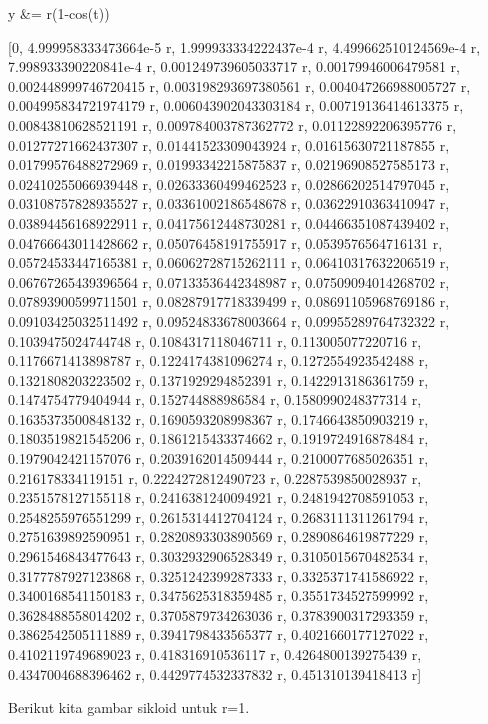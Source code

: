 \documentclass{article}
\begin{document}
\>y &= r\*(1-cos(t))


    
            [0, 4.999958333473664e-5 r, 1.999933334222437e-4 r, 
    4.499662510124569e-4 r, 7.998933390220841e-4 r, 
    0.001249739605033717 r, 0.00179946006479581 r, 
    0.002448999746720415 r, 0.003198293697380561 r, 
    0.004047266988005727 r, 0.004995834721974179 r, 
    0.006043902043303184 r, 0.00719136414613375 r, 0.00843810628521191 r, 
    0.009784003787362772 r, 0.01122892206395776 r, 0.01277271662437307 r, 
    0.01441523309043924 r, 0.01615630721187855 r, 0.01799576488272969 r, 
    0.01993342215875837 r, 0.02196908527585173 r, 0.02410255066939448 r, 
    0.02633360499462523 r, 0.02866202514797045 r, 0.03108757828935527 r, 
    0.03361002186548678 r, 0.03622910363410947 r, 0.03894456168922911 r, 
    0.04175612448730281 r, 0.04466351087439402 r, 0.04766643011428662 r, 
    0.05076458191755917 r, 0.0539576564716131 r, 0.05724533447165381 r, 
    0.06062728715262111 r, 0.06410317632206519 r, 0.06767265439396564 r, 
    0.07133536442348987 r, 0.07509094014268702 r, 0.07893900599711501 r, 
    0.08287917718339499 r, 0.08691105968769186 r, 0.09103425032511492 r, 
    0.09524833678003664 r, 0.09955289764732322 r, 0.1039475024744748 r, 
    0.1084317118046711 r, 0.113005077220716 r, 0.1176671413898787 r, 
    0.1224174381096274 r, 0.1272554923542488 r, 0.1321808203223502 r, 
    0.1371929294852391 r, 0.1422913186361759 r, 0.1474754779404944 r, 
    0.152744888986584 r, 0.1580990248377314 r, 0.1635373500848132 r, 
    0.1690593208998367 r, 0.1746643850903219 r, 0.1803519821545206 r, 
    0.1861215433374662 r, 0.1919724916878484 r, 0.1979042421157076 r, 
    0.2039162014509444 r, 0.2100077685026351 r, 0.216178334119151 r, 
    0.2224272812490723 r, 0.2287539850028937 r, 0.2351578127155118 r, 
    0.2416381240094921 r, 0.2481942708591053 r, 0.2548255976551299 r, 
    0.2615314412704124 r, 0.2683111311261794 r, 0.2751639892590951 r, 
    0.2820893303890569 r, 0.2890864619877229 r, 0.2961546843477643 r, 
    0.3032932906528349 r, 0.3105015670482534 r, 0.3177787927123868 r, 
    0.3251242399287333 r, 0.3325371741586922 r, 0.3400168541150183 r, 
    0.3475625318359485 r, 0.3551734527599992 r, 0.3628488558014202 r, 
    0.3705879734263036 r, 0.3783900317293359 r, 0.3862542505111889 r, 
    0.3941798433565377 r, 0.4021660177127022 r, 0.4102119749689023 r, 
    0.418316910536117 r, 0.4264800139275439 r, 0.4347004688396462 r, 
    0.4429774532337832 r, 0.451310139418413 r]
    

Berikut kita gambar sikloid untuk r=1.
\end{document}
